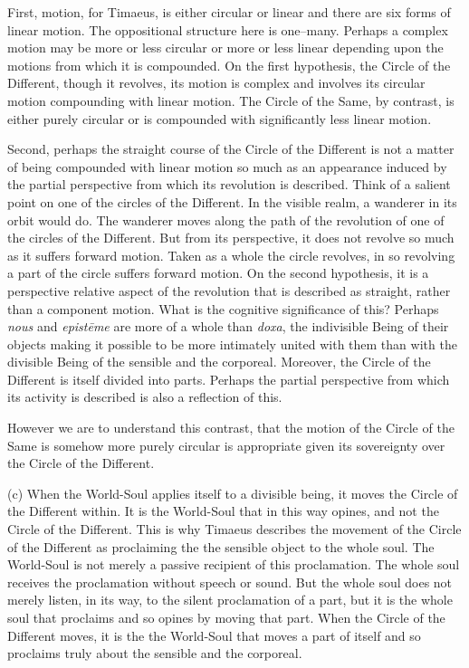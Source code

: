 First, motion, for Timaeus, is either circular or linear and there are six forms of linear motion. The oppositional structure here is one--many. Perhaps a complex motion may be more or less circular or more or less linear depending upon the motions from which it is compounded. On the first hypothesis, the Circle of the Different, though it revolves, its motion is complex and involves its circular motion compounding with linear motion. The Circle of the Same, by contrast, is either purely circular or is compounded with significantly less linear motion. 

Second, perhaps the straight course of the Circle of the Different is not a matter of being compounded with linear motion so much as an appearance induced by the partial perspective from which its revolution is described. Think of a salient point on one of the circles of the Different. In the visible realm, a wanderer in its orbit would do. The wanderer moves along the path of the revolution of one of the circles of the Different. But from its perspective, it does not revolve so much as it suffers forward motion.  Taken as a whole the circle revolves, in so revolving a part of the circle suffers forward motion. On the second hypothesis, it is a perspective relative aspect of the revolution that is described as straight, rather than a component motion. What is the cognitive significance of this? Perhaps \emph{nous} and \emph{epistēme} are more of a whole than \emph{doxa}, the indivisible Being of their objects making it possible to be more intimately united with them than with the divisible Being of the sensible and the corporeal. Moreover, the Circle of the Different is itself divided into parts. Perhaps the partial perspective from which its activity is described is also a reflection of this.

However we are to understand this contrast, that the motion of the Circle of the Same is somehow more purely circular is appropriate given its sovereignty over the Circle of the Different.

(c) When the World-Soul applies itself to a divisible being, it moves the Circle of the Different within. It is the World-Soul that in this way opines, and not the Circle of the Different. This is why Timaeus describes the movement of the Circle of the Different as proclaiming the the sensible object to the whole soul. The World-Soul is not merely a passive recipient of this proclamation. The whole soul receives the proclamation without speech or sound. But the whole soul does not merely listen, in its way, to the silent proclamation of a part, but it is the whole soul that proclaims and so opines by moving that part. When the Circle of the Different moves, it is the the World-Soul that moves a part of itself and so proclaims truly about the sensible and the corporeal. 

